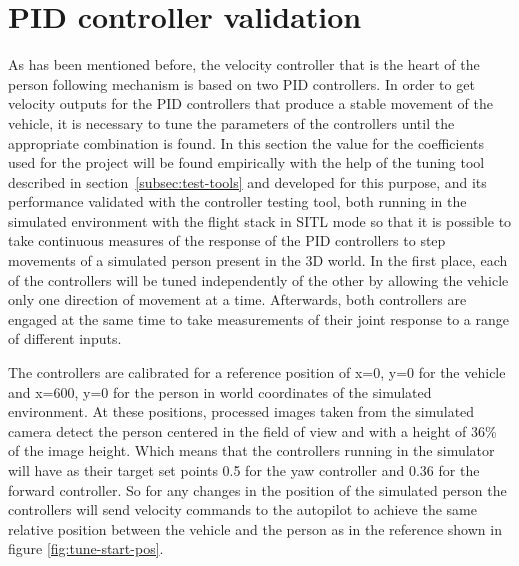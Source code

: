 
\clearpage

\section{PID controller validation}
\label{sec:test-1-pid}



As has been mentioned before, the velocity controller that is the heart of the person following mechanism is based on two PID controllers.
In order to get velocity outputs for the PID controllers that produce a stable movement of the vehicle, it is necessary to tune the parameters of the controllers until the appropriate combination is found.
In this section the value for the coefficients used for the project will be found empirically with the help of the tuning tool described in section~\ref{subsec:test-tools} and developed for this purpose, and its performance validated with the controller testing tool, both running in the simulated environment with the flight stack in SITL mode so that it is possible to take continuous measures of the response of the PID controllers to step movements of a simulated person present in the 3D world.
In the first place, each of the controllers will be tuned independently of the other by allowing the vehicle only one direction of movement at a time.
Afterwards, both controllers are engaged at the same time to take measurements of their joint response to a range of different inputs.

The controllers are calibrated for a reference position of x=0, y=0 for the vehicle and x=600, y=0 for the person in world coordinates of the simulated environment.
At these positions, processed images taken from the simulated camera detect the person centered in the field of view and with a height of 36\% of the image height.
Which means that the controllers running in the simulator will have as their target set points 0.5 for the yaw controller and 0.36 for the forward controller. So for any changes in the position of the simulated person the controllers will send velocity commands to the autopilot to achieve the same relative position between the vehicle and the person as in the reference shown in figure \ref{fig:tune-start-pos}.


